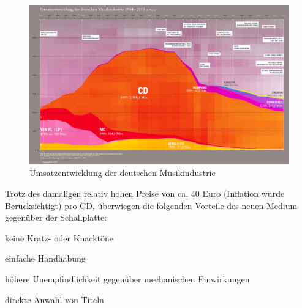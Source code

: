 \begin{figure}[h]
  \begin{center}
      \begin{minipage}[t]{\textwidth}
        \begin{center}
            \includegraphics[width=\textwidth]{Bilder/Optische_Datentraeger_Die_Compact_Disc/Geschichte/umsatzcd.png}
            \caption[Umsatzentwicklung der deutschen Musikindustrie \newline \url{http://www.musikindustrie.de/uploads/media/140325\_BVMI\_2013\_Jahrbuch\_ePaper\_V02.pdf (zuletzt aufgerufen am 01.07.2015)}]{Umsatzentwicklung der deutschen Musikindustrie}
            \label{fig:umsatzcd}
        \end{center}
      \end{minipage}
  \end{center}
\end{figure}

Trotz des damaligen relativ hohen Preise von ca. 40 Euro (Inflation wurde Berücksichtigt) pro CD, überwiegen die folgenden Vorteile des neuen Medium gegenüber der Schallplatte:
\begin{itemize*}
    \item keine Kratz- oder Knacktöne
    \item einfache Handhabung
    \item höhere Unempfindlichkeit gegenüber mechanischen Einwirkungen
    \item direkte Anwahl von Titeln
\end{itemize*}
